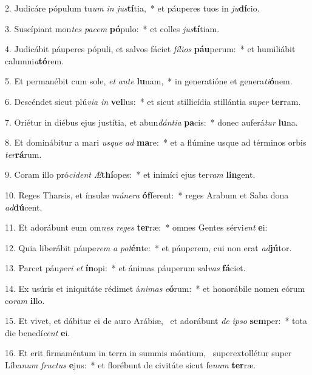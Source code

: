 2. Judicáre pópulum tu\textit{um} \textit{in} \textit{jus}\textbf{tí}tia,~*  et páuperes tuos in \textit{ju}\textbf{dí}cio.\

3. Suscípiant mon\textit{tes} \textit{pa}\textit{cem} \textbf{pó}pulo:~*  et colles \textit{jus}\textbf{tí}tiam.\

4. Judicábit páuperes pópuli, et salvos fáciet \textit{fí}\textit{li}\textit{os} \textbf{páu}perum:~*  et humiliábit calumni\textit{a}\textbf{tó}rem.\

5. Et permanébit cum sole, \textit{et} \textit{an}\textit{te} \textbf{lu}nam,~*  in generatióne et genera\textit{ti}\textbf{ó}nem.\

6. Descéndet sicut plú\textit{vi}\textit{a} \textit{in} \textbf{vel}lus:~*  et sicut stillicídia stillántia su\textit{per} \textbf{ter}ram.\

7. Oriétur in diébus ejus justítia, et abun\textit{dán}\textit{ti}\textit{a} \textbf{pa}cis:~*  donec auferá\textit{tur} \textbf{lu}na.\

8. Et dominábitur a mari \textit{us}\textit{que} \textit{ad} \textbf{ma}re:~*  et a flúmine usque ad términos orbis \textit{ter}\textbf{rá}rum.\

9. Coram illo pró\textit{ci}\textit{dent} \textit{Æ}\textbf{thí}opes:~*  et inimíci ejus ter\textit{ram} \textbf{lin}gent.\

10. Reges Tharsis, et ínsulæ \textit{mú}\textit{ne}\textit{ra} \textbf{óf}ferent:~*  reges Arabum et Saba dona \textit{ad}\textbf{dú}cent.\

11. Et adorábunt eum om\textit{nes} \textit{re}\textit{ges} \textbf{ter}ræ:~*  omnes Gentes sérvi\textit{ent} \textbf{e}i:\

12. Quia liberábit páupe\textit{rem} \textit{a} \textit{pot}\textbf{én}te:~*  et páuperem, cui non erat \textit{ad}\textbf{jú}tor.\

13. Parcet páu\textit{pe}\textit{ri} \textit{et} \textbf{ín}opi:~*  et ánimas páuperum sal\textit{vas} \textbf{fá}ciet.\

14. Ex usúris et iniquitáte rédimet á\textit{ni}\textit{mas} \textit{e}\textbf{ó}rum:~*  et honorábile nomen eórum co\textit{ram} \textbf{il}lo.\

15. Et vivet, et dábitur ei de auro Arábiæ, \dag\  et adorábunt \textit{de} \textit{ip}\textit{so} \textbf{sem}per:~*  tota die benedí\textit{cent} \textbf{e}i.\

16. Et erit firmaméntum in terra in summis móntium, \dag\  superextollétur super Líba\textit{num} \textit{fruc}\textit{tus} \textbf{e}jus:~*  et florébunt de civitáte sicut fe\textit{num} \textbf{ter}ræ.\

